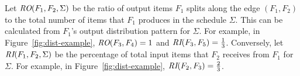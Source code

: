Let $\mbox{\it RO}(F_1, F_2, \Sigma)$ be the ratio of output items $F_1$
splits along the edge $(F_1, F_2)$ to the total number of items that
$F_1$ produces in the schedule $\Sigma$.  This can be calculated from
$F_1$'s output distribution pattern for $\Sigma$.  For example, in
Figure~\ref{fig:dist-example}, $\mbox{\it RO}(F_3, F_4) = 1$ and
$\mbox{\it RI}(F_3, F_5) = \frac{1}{3}$.  Conversely, let $\mbox{\it RI}(F_1, F_2,
\Sigma)$ be the percentage of total input items that $F_2$ receives
from $F_1$ for $\Sigma$.  For example, in
Figure~\ref{fig:dist-example}, $\mbox{\it RI}(F_2,F_3) = \frac{2}{3}$.

